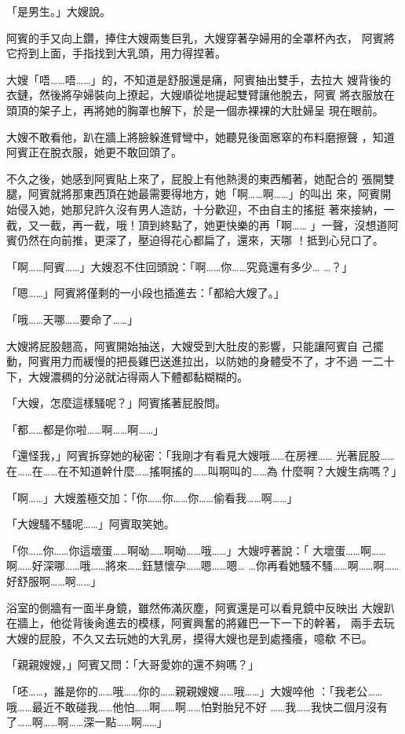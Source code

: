 「是男生。」大嫂說。

阿賓的手又向上鑽，捧住大嫂兩隻巨乳，大嫂穿著孕婦用的全罩杯內衣，
阿賓將它捋到上面，手指找到大乳頭，用力得捏著。

大嫂「唔……唔……」的，不知道是舒服還是痛，阿賓抽出雙手，去拉大
嫂背後的衣鏈，然後將孕婦裝向上撩起，大嫂順從地提起雙臂讓他脫去，阿賓
將衣服放在頭頂的架子上，再將她的胸罩也解下，於是一個赤裸裸的大肚婦呈
現在眼前。

大嫂不敢看他，趴在牆上將臉躲進臂彎中，她聽見後面窸窣的布料磨擦聲
，知道阿賓正在脫衣服，她更不敢回頭了。

不久之後，她感到阿賓貼上來了，屁股上有他熱燙的東西觸著，她配合的
張開雙腿，阿賓就將那東西頂在她最需要得地方，她「啊……啊……」的叫出
來，阿賓開始侵入她，她那兒許久沒有男人造訪，十分歡迎，不由自主的搖挺
著來接納，一截，又一截，再一截，哦！頂到終點了，她更快樂的再「啊……
」一聲，沒想道阿賓仍然在向前推，更深了，壓迫得花心都扁了，還來，天哪
！抵到心兒口了。

「啊……阿賓……」大嫂忍不住回頭說：「啊……你……究竟還有多少…
…？」

「嗯……」阿賓將僅剩的一小段也插進去：「都給大嫂了。」

「哦……天哪……要命了……」

大嫂將屁股翹高，阿賓開始抽送，大嫂受到大肚皮的影響，只能讓阿賓自
己擺動，阿賓用力而緩慢的把長雞巴送進拉出，以防她的身體受不了，才不過
一二十下，大嫂濃稠的分泌就沾得兩人下體都黏糊糊的。

「大嫂，怎麼這樣騷呢？」阿賓搖著屁股問。

「都……都是你啦……啊……啊……」

「還怪我，」阿賓拆穿她的秘密：「我剛才有看見大嫂哦……在房裡……
光著屁股……在……在……在不知道幹什麼……搖啊搖的……叫啊叫的……為
什麼啊？大嫂生病嗎？」

「啊……」大嫂羞極交加：「你……你……你……偷看我……啊……」

「大嫂騷不騷呢……」阿賓取笑她。

「你……你……你這壞蛋……啊呦……啊呦……哦……」大嫂哼著說：「
大壞蛋……啊……啊……好深哪……哦……將來……鈺慧懷孕……嗯……嗯…
…你再看她騷不騷……啊……啊……好舒服啊……啊……」

浴室的側牆有一面半身鏡，雖然佈滿灰塵，阿賓還是可以看見鏡中反映出
大嫂趴在牆上，他從背後肏進去的模樣，阿賓興奮的將雞巴一下一下的幹著，
兩手去玩大嫂的屁股，不久又去玩她的大乳房，摸得大嫂也是到處搔癢，噫欷
不已。

「親親嫂嫂，」阿賓又問：「大哥愛妳的還不夠嗎？」

「呸……，誰是你的……哦……你的……親親嫂嫂……哦……」大嫂啐他
：「我老公……哦……最近不敢碰我……他怕……啊……啊……怕對胎兒不好
……我……我快二個月沒有了……啊……啊……深一點……啊……」

